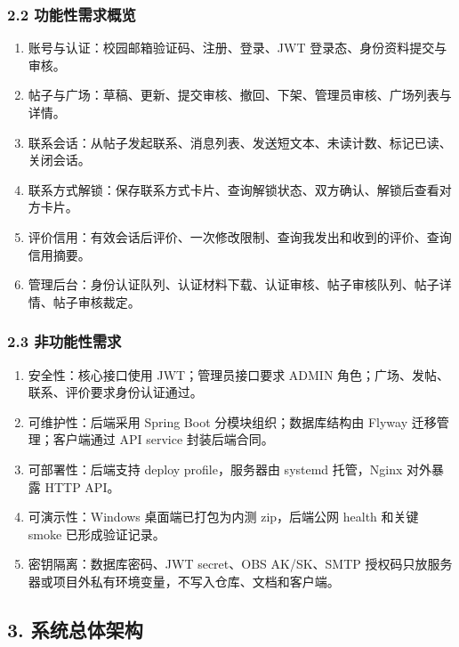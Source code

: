 \documentclass[
]{ctexart}
\providecommand{\tightlist}{%
  \setlength{\itemsep}{0pt}\setlength{\parskip}{0pt}}
\begin{document}
\hypertarget{ux529fux80fdux6027ux9700ux6c42ux6982ux89c8}{%
\subsubsection{2.2
功能性需求概览}\label{ux529fux80fdux6027ux9700ux6c42ux6982ux89c8}}

\begin{enumerate}
\def\labelenumi{\arabic{enumi}.}
\tightlist
\item
  账号与认证：校园邮箱验证码、注册、登录、JWT
  登录态、身份资料提交与审核。
\item
  帖子与广场：草稿、更新、提交审核、撤回、下架、管理员审核、广场列表与详情。
\item
  联系会话：从帖子发起联系、消息列表、发送短文本、未读计数、标记已读、关闭会话。
\item
  联系方式解锁：保存联系方式卡片、查询解锁状态、双方确认、解锁后查看对方卡片。
\item
  评价信用：有效会话后评价、一次修改限制、查询我发出和收到的评价、查询信用摘要。
\item
  管理后台：身份认证队列、认证材料下载、认证审核、帖子审核队列、帖子详情、帖子审核裁定。
\end{enumerate}

\hypertarget{ux975eux529fux80fdux6027ux9700ux6c42}{%
\subsubsection{2.3
非功能性需求}\label{ux975eux529fux80fdux6027ux9700ux6c42}}

\begin{enumerate}
\def\labelenumi{\arabic{enumi}.}
\tightlist
\item
  安全性：核心接口使用 JWT；管理员接口要求 ADMIN
  角色；广场、发帖、联系、评价要求身份认证通过。
\item
  可维护性：后端采用 Spring Boot 分模块组织；数据库结构由 Flyway
  迁移管理；客户端通过 API service 封装后端合同。
\item
  可部署性：后端支持 deploy profile，服务器由 systemd 托管，Nginx
  对外暴露 HTTP API。
\item
  可演示性：Windows 桌面端已打包为内测 zip，后端公网 health 和关键 smoke
  已形成验证记录。
\item
  密钥隔离：数据库密码、JWT secret、OBS AK/SK、SMTP
  授权码只放服务器或项目外私有环境变量，不写入仓库、文档和客户端。
\end{enumerate}

\hypertarget{ux7cfbux7edfux603bux4f53ux67b6ux6784}{%
\subsection{3.
系统总体架构}\label{ux7cfbux7edfux603bux4f53ux67b6ux6784}}
\end{document}
